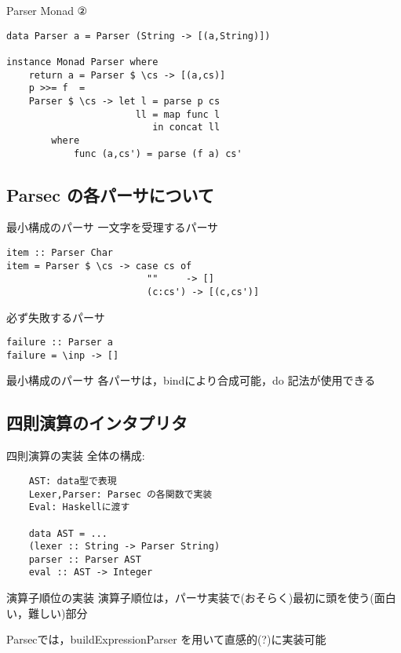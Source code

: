 \documentclass[uplatex,dvipdfmx,ja=standard]{beamer}
\begin{document}
\begin{frame}[fragile]{Parser Monad ②}
    \begin{verbatim}
data Parser a = Parser (String -> [(a,String)])

instance Monad Parser where
    return a = Parser $ \cs -> [(a,cs)]
    p >>= f  = 
    Parser $ \cs -> let l = parse p cs
                       ll = map func l
                          in concat ll
        where
            func (a,cs') = parse (f a) cs'
    \end{verbatim}
\end{frame}

\subsection{Parsec の各パーサについて}

\begin{frame}[fragile]{最小構成のパーサ}
一文字を受理するパーサ
    \begin{verbatim}
item :: Parser Char
item = Parser $ \cs -> case cs of
                         ""     -> []
                         (c:cs') -> [(c,cs')]
    \end{verbatim}
必ず失敗するパーサ
    \begin{verbatim}
failure :: Parser a
failure = \inp -> []
    \end{verbatim}
\end{frame}


\begin{frame}{最小構成のパーサ}
    各パーサは，bindにより合成可能，do 記法が使用できる

\end{frame}

\subsection{四則演算のインタプリタ}

\begin{frame}[fragile]{四則演算の実装}
    全体の構成:
    \begin{verbatim}
    AST: data型で表現
    Lexer,Parser: Parsec の各関数で実装
    Eval: Haskellに渡す

    data AST = ...
    (lexer :: String -> Parser String)
    parser :: Parser AST
    eval :: AST -> Integer
    \end{verbatim}
\end{frame}

\begin{frame}[fragile]{演算子順位の実装}
    演算子順位は，パーサ実装で(おそらく)最初に頭を使う(面白い，難しい)部分

    Parsecでは，buildExpressionParser を用いて直感的(?)に実装可能
\end{frame}
\end{document}
